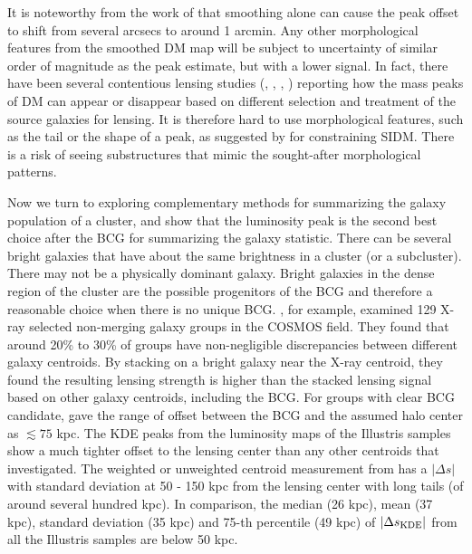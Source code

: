 It is noteworthy from the work of \cite{Dietrich2012} that 
smoothing alone can cause the peak offset to shift from several arcsecs to
around 1 arcmin.
Any other morphological features from the smoothed DM map will be subject 
to uncertainty of similar order of magnitude as the peak
estimate, but with a lower signal. 
In fact, there have been several contentious lensing studies (\citealt{Clowe2012},
\citealt{Jee2014b}, \citealt{Wittman2014}, \citealt{Cook2012})
reporting how the mass peaks of DM can appear or disappear based on
different selection and treatment of the source galaxies for lensing. 
It is therefore hard to use morphological features, such as the tail or the shape 
of a peak,
as suggested by \cite{Kahlhoefer14} for constraining SIDM.
There is a risk of seeing substructures that mimic the sought-after 
morphological patterns. 

Now we turn to exploring complementary methods for summarizing
the galaxy population of a cluster, and show that  the luminosity peak 
is the second best choice after the BCG for summarizing the galaxy statistic.
There can be several bright galaxies that have about the same brightness 
in a cluster (or a subcluster). There may not be a physically dominant galaxy.  
Bright galaxies in the dense region of the cluster are the possible progenitors 
of the BCG and therefore a reasonable choice when there is no unique BCG. 
\cite{George2012a}, for example, examined 129 X-ray selected non-merging galaxy 
groups in the COSMOS field.
They found that around 20\% to 30\% of groups have non-negligible discrepancies
between different galaxy centroids. 
By stacking on a bright galaxy near the X-ray centroid, they found  
the resulting lensing strength is higher than the stacked lensing signal based
on other galaxy centroids, including the BCG. 
For groups with clear BCG candidate, \cite{George2012a} gave the range of
offset between the BCG and the assumed halo center as $\lesssim 75$ kpc. 
The KDE peaks from the luminosity maps of the Illustris samples show a much 
tighter offset to the 
lensing center than any other centroids that \cite{George2012a} investigated. 
The weighted or unweighted centroid measurement from \cite{George2012a} has a 
$|\Delta s|$ with standard deviation at 50 - 150 kpc from the
lensing center with long tails (of around several hundred kpc). 
In comparison, the median (26 kpc), mean (37 kpc), standard deviation (35 kpc) 
and 75-th percentile (49 kpc) of 
$|\Delta s_{\rm KDE}|$ from all the Illustris samples are below 50 kpc. 


